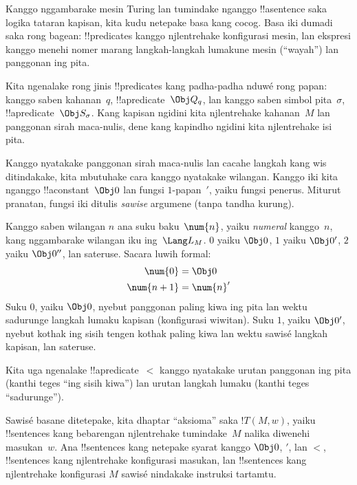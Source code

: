 \documentclass[../../../include/open-logic-section]{subfiles}
\begin{document}

\begin{explain}
Kanggo nggambarake mesin Turing lan tumindake nganggo
!!a{sentence} saka logika tataran kapisan, kita kudu
netepake basa kang cocog. Basa iki dumadi saka rong
bagean: !!{predicate}s kanggo njlentrehake konfigurasi
mesin, lan ekspresi kanggo menehi nomer marang
langkah-langkah lumakune mesin (``wayah'') lan
panggonan ing pita.

Kita ngenalake rong jinis !!{predicate}s kang
padha-padha nduwé rong papan: kanggo saben
kahanan~$q$, !!a{predicate}~$\Obj Q_q$,
lan kanggo saben simbol pita~$\sigma$,
!!a{predicate}~$\Obj S_\sigma$. Kang kapisan
ngidini kita njlentrehake kahanan~$M$ lan
panggonan sirah maca-nulis, dene kang kapindho
ngidini kita njlentrehake isi pita.

Kanggo nyatakake panggonan sirah maca-nulis
lan cacahe langkah kang wis ditindakake,
kita mbutuhake cara kanggo nyatakake wilangan.
Kanggo iki kita nganggo !!a{constant}~$\Obj 0$
lan fungsi $1$-papan~$\prime$, yaiku fungsi
penerus. Miturut pranatan, fungsi iki ditulis
\emph{sawise} argumene (tanpa tandha kurung).

Kanggo saben wilangan $n$ ana suku baku~$\num{n}$,
yaiku \emph{numeral} kanggo~$n$, kang
nggambarake wilangan iku ing~$\Lang L_M$.
$\num{0}$ yaiku $\Obj 0$, $\num{1}$
yaiku $\Obj 0'$, $\num{2}$ yaiku $\Obj 0''$,
lan sateruse. Sacara luwih formal:
\begin{align*}
\num{0} & = \Obj 0 \\
\num{n+1} &= \num{n}'
\end{align*}
Suku $\num{0}$, yaiku $\Obj 0$, nyebut
panggonan paling kiwa ing pita lan wektu
sadurunge langkah lumaku kapisan (konfigurasi
wiwitan). Suku $\num{1}$, yaiku $\Obj 0'$,
nyebut kothak ing sisih tengen kothak paling
kiwa lan wektu sawisé langkah kapisan,
lan sateruse.

Kita uga ngenalake !!a{predicate}~$<$ kanggo
nyatakake urutan panggonan ing pita (kanthi
teges ``ing sisih kiwa'') lan urutan langkah
lumaku (kanthi teges ``sadurunge'').

Sawisé basane ditetepake, kita dhaptar
``aksioma'' saka $!T(M, w)$, yaiku
!!{sentence}s kang bebarengan njlentrehake
tumindake~$M$ nalika diwenehi masukan~$w$.
Ana !!{sentence}s kang netepake syarat
kanggo $\Obj 0$, $\prime$, lan $<$,
!!{sentence}s kang njlentrehake konfigurasi
masukan, lan !!{sentence}s kang njlentrehake
konfigurasi $M$ sawisé nindakake instruksi
tartamtu.
\end{explain}
\end{document}
